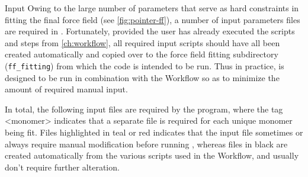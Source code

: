 \begin{subsection}{Input}
Owing to the large number of parameters that serve as hard constraints in
fitting the final \mastiff force field
(see \cref{fig:pointer-ff}), a number of input parameters files are required
in \pointer.
Fortunately, provided the user has already executed the scripts and steps
from
\cref{ch:workflow}, all required input scripts should have all been created
automatically and copied over to the force field fitting subdirectory
(\verb|ff_fitting|) from which the \pointer code is intended to be run.
Thus in practice, \pointer is designed to be run in combination with the
Workflow so as to minimize the amount of required manual input.

In total, the following input files are required by the \pointer program,
where the tag <monomer> indicates that a separate file is required for each
unique monomer being fit. Files highlighted in
\textcolor{codegreen}{teal} or \textcolor{codepurple}{red} indicates that the input file
sometimes or always require
manual modification before running \pointer, whereas files in black are
created automatically from the various scripts used in the Workflow, and
usually don't require further alteration.


\end{subsection}
